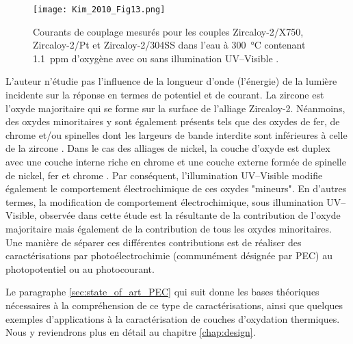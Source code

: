 \begin{refsection}
    \begin{figure}[H]
        \centering
        \texttt{[image: Kim\_2010\_Fig13.png]} 
        \caption[Courants de couplage mesurés pour les couples Zircaloy-2/X750, Zircaloy-2/Pt et Zircaloy-2/304SS dans l'eau à
        \SI{300}{\degreeCelsius} contenant \SI{1.1}{ppm} d'oxygène avec ou sans illumination UV--Visible.]
        {Courants de couplage mesurés pour les couples Zircaloy-2/X750, Zircaloy-2/Pt et Zircaloy-2/304SS dans l'eau à
        \SI{300}{\degreeCelsius} contenant \SI{1.1}{ppm} d'oxygène avec ou sans illumination UV--Visible \citep{Kim2010}.} 
        \label{fig:kim_current_vs_time_O2_UV} 
    \end{figure}

    L’auteur n’étudie pas l’influence de la longueur d'onde (l’énergie) de la lumière incidente sur la réponse
    en termes de potentiel et de courant. 
    La zircone est l'oxyde majoritaire qui se forme sur la surface de l'alliage Zircaloy-2. 
    Néanmoins, des oxydes minoritaires y sont
    également présents tels que des oxydes de fer, de chrome et/ou spinelles dont les largeurs de bande interdite sont
    inférieures à celle de la zircone \citep{Atmani2008,Loucif2013}. Dans le cas des alliages de nickel, la couche
    d'oxyde est duplex avec une couche interne riche en chrome et une couche externe formée de spinelle de
    nickel, fer et chrome \citep{Marchetti2006}.
    Par conséquent, l’illumination UV--Visible modifie également
    le comportement électrochimique de ces oxydes "mineurs". En d’autres termes, la modification de comportement
    électrochimique, sous illumination UV--Visible, observée dans cette étude est la résultante de la contribution de l’oxyde
    majoritaire mais également de la contribution de tous les oxydes minoritaires.
    Une manière de séparer ces différentes contributions est de réaliser des caractérisations par photoélectrochimie
    (communément désignée par PEC) au photopotentiel ou au photocourant.


    Le paragraphe \ref{sec:state_of_art_PEC} qui suit donne les bases théoriques nécessaires à la compréhension de ce
    type de caractérisations, ainsi que quelques exemples d'applications à la caractérisation de couches d'oxydation
    thermiques. Nous y reviendrons plus en détail au chapitre \ref{chap:design}.

    
    


\end{refsection}
